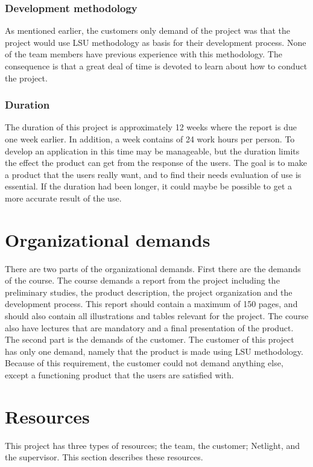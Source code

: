 \subsubsection{Development methodology}
As mentioned earlier, the customers only demand of the project was that the project would use \gls{LSU} methodology as basis for their development process. None of the team members have previous experience with this methodology. The consequence is that a great deal of time is devoted to learn about how to conduct the project. 

\subsubsection{Duration}
The duration of this project is approximately 12 weeks where the report is due one week earlier. In addition, a week contains of 24 work hours per person. To develop an application in this time may be manageable, but the duration limits the effect the product can get from the response of the users. The goal is to make a product that the users really want, and to find their needs evaluation of use is essential. If the duration had been longer, it could maybe be possible to get a more accurate result of the use.


\section{Organizational demands}
There are two parts of the organizational demands. First there are the demands of the course. The course demands a report from the project including the preliminary studies, the product description, the project organization and the development process. This report should contain a maximum of 150 pages, and should also contain all illustrations and tables relevant for the project. The course also have lectures that are mandatory and a final presentation of the product.
The second part is the demands of the customer. The customer of this project has only one demand, namely that the product is made using \gls{LSU} methodology. Because of this requirement, the customer could not demand anything else, except a functioning product that the users are satisfied with.

\section{Resources}
This project has three types of resources; the team, the customer; Netlight, and the supervisor. This section describes these resources.

